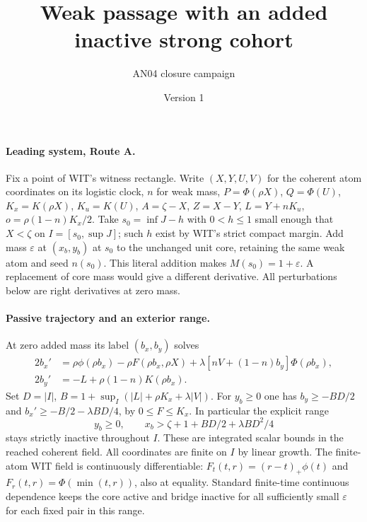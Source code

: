 \documentclass[11pt]{article}
\title{Weak passage with an added inactive strong cohort}
\author{AN04 closure campaign}\date{Version 1}
\begin{document}
\maketitle
\paragraph{Leading system, Route A.}
Fix a point of WIT's witness rectangle. Write $(X,Y,U,V)$ for
the coherent atom coordinates on its logistic clock, $n$ for weak mass,
$P=\Phi(\rho X)$, $Q=\Phi(U)$, $K_x=K(\rho X)$, $K_u=K(U)$,
$A=\zeta-X$, $Z=X-Y$, $L=Y+nK_u$, $o=\rho(1-n)K_x/2$.
Take $s_0=\inf J-h$ with $0<h\le1$ small enough that $X<\zeta$
on $I=[s_0,\sup J]$; such $h$ exist by WIT's strict compact margin.
Add mass $\varepsilon$ at $(x_b,y_b)$ at $s_0$ to the unchanged
unit core, retaining the same weak atom and seed $n(s_0)$.
This literal addition makes $M(s_0)=1+\varepsilon$.
A replacement of core mass would give a different derivative.
All perturbations below are right derivatives at zero mass.

\paragraph{Passive trajectory and an exterior range.}
At zero added mass its label $(b_x,b_y)$ solves
\begin{align*}
 2b_x'&=\rho\phi(\rho b_x)-\rho F(\rho b_x,\rho X)
      +\lambda[nV+(1-n)b_y]\Phi(\rho b_x),\\
 2b_y'&=-L+\rho(1-n)K(\rho b_x).
\end{align*}
Set $D=|I|$, $B=1+\sup_I (|L|+\rho K_x+\lambda |V|)$.
For $y_b\ge0$ one has $b_y\ge-BD/2$ and
$b_x'\ge-B/2-\lambda BD/4$, by $0\le F\le K_x$.
In particular the explicit range
\begin{equation}\label{an04swpv1:outside}
 y_b\ge0,\qquad x_b>\zeta+1+BD/2+\lambda BD^2/4
\end{equation}
stays strictly inactive throughout $I$. These are integrated scalar
bounds in the reached coherent field. All coordinates are finite on
$I$ by linear growth. The finite-atom WIT field is continuously
differentiable: $F_t(t,r)=(r-t)_+\phi(t)$ and
$F_r(t,r)=\Phi(\min(t,r))$, also at equality. Standard finite-time
continuous dependence keeps the core active and bridge inactive for
all sufficiently small $\varepsilon$ for each fixed pair in this range.
\end{document}
